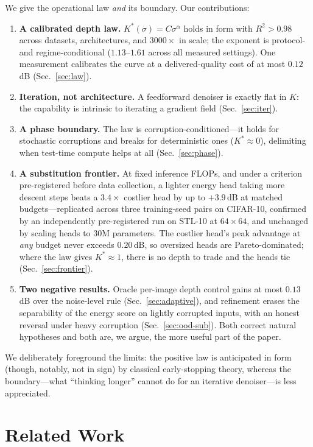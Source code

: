 \documentclass[letterpaper]{article}
\begin{document}
We give the operational law \emph{and} its boundary. Our contributions:
\begin{enumerate}
\item \textbf{A calibrated depth law.} $K^{*}(\sigma)=C\sigma^{\alpha}$ holds in form with $R^2>0.98$
across datasets, architectures, and $3000\times$ in scale; the exponent is protocol- and
regime-conditional ($1.13$--$1.61$ across all measured settings). One measurement calibrates the curve at
a delivered-quality cost of at most $0.12$\,dB (Sec.~\ref{sec:law}).
\item \textbf{Iteration, not architecture.} A feedforward denoiser is exactly flat in $K$: the capability
is intrinsic to iterating a gradient field (Sec.~\ref{sec:iter}).
\item \textbf{A phase boundary.} The law is corruption-conditioned---it holds for stochastic corruptions and
breaks for deterministic ones ($K^{*}\!\approx\!0$), delimiting when test-time compute helps at all
(Sec.~\ref{sec:phase}).
\item \textbf{A substitution frontier.} At fixed inference FLOPs, and under a criterion pre-registered
before data collection, a lighter energy head taking more descent steps beats a $3.4\times$ costlier head
by up to $+3.9$\,dB at matched budgets---replicated across three training-seed pairs on CIFAR-10,
confirmed by an independently pre-registered run on STL-10 at $64\times64$, and unchanged by scaling
heads to $30$M parameters. The costlier head's peak advantage at \emph{any} budget never exceeds
$0.20$\,dB, so oversized heads are Pareto-dominated; where the law gives $K^{*}\!\approx\!1$, there is no
depth to trade and the heads tie (Sec.~\ref{sec:frontier}).
\item \textbf{Two negative results.} Oracle per-image depth control gains at most $0.13$\,dB over the
noise-level rule (Sec.~\ref{sec:adaptive}), and refinement erases the separability of the energy score on
lightly corrupted inputs, with an honest reversal under heavy corruption (Sec.~\ref{sec:ood-sub}). Both
correct natural hypotheses and both are, we argue, the more useful part of the paper.
\end{enumerate}
We deliberately foreground the limits: the positive law is anticipated in form (though, notably, not in
sign) by classical early-stopping theory, whereas the boundary---what ``thinking longer'' cannot do for an
iterative denoiser---is less appreciated.

\section{Related Work}
\end{document}
